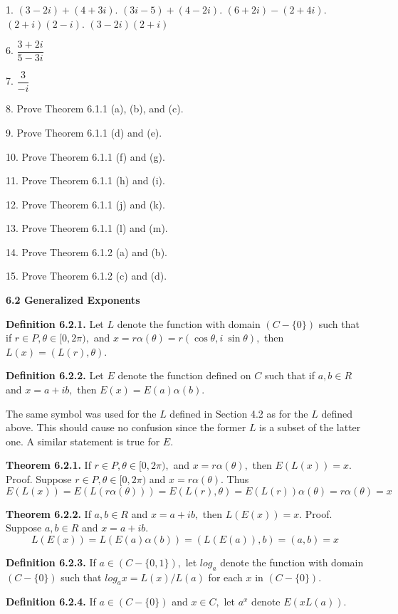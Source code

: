 1. 	$(3 - 2i) + (4 + 3i)$. 	$(3i - 5) + (4 - 2i)$. 	$(6 + 2i) - (2 + 4i)$. 	$(2 + i)(2 - i)$. 	$(3 - 2i)(2 + i)$\nl

6. 	$\dfrac{3 + 2i}{5 - 3i}$\nl

7.  $\dfrac{3}{-i}$\nl

8. 	Prove Theorem 6.1.1 (a), (b), and (c). \nl

9. 	Prove Theorem 6.1.1 (d) and (e).

10. Prove Theorem 6.1.1 (f) and (g).

11. Prove Theorem 6.1.1 (h) and (i).

12. Prove Theorem 6.1.1 (j) and (k).

13. Prove Theorem 6.1.1 (l) and (m).

14. Prove Theorem 6.1.2 (a) and (b).

15. Prove Theorem 6.1.2 (c) and (d).


\newpage
\textbf{6.2 Generalized Exponents}\nl

\textbf{Definition 6.2.1.} Let $L$ denote the function with domain $(C-\{0\})$ such that if $r\in P, \theta\in[0, 2\pi),$ and $x =r\alpha (\theta) = r(\cos \theta, i~\sin \theta),$ then $L(x) = (L(r),\theta).$ \nl

\textbf{Definition 6.2.2.} Let $E$ denote the function defined on $C$ such that if $a,b\in R$ and $x = a + ib,$ then $E(x) = E(a)\alpha(b).$\nl

The same symbol was used for the $L$ defined in Section 4.2 as for the $L$ defined above. This should cause no confusion since the former $L$ is a subset of the latter one. A similar statement is true for $E.$\nl

\textbf{Theorem 6.2.1.} If $r\in P, \theta \in  [0,2\pi),$ and $x =r\alpha(\theta),$ then $E(L(x))=x.$\nl
 Proof. Suppose $r\in P, \theta \in  [0,2\pi)$ and $x =r\alpha(\theta).$ Thus
 \[
 E(L(x)) = E(L(r\alpha(\theta)))=E(L(r),\theta) = E(L(r))\alpha(\theta) = r\alpha(\theta) = x
 \]

\textbf{Theorem 6.2.2.} If $a,b\in R$ and $x = a + ib,$ then $L(E(x))=x.$\nl
Proof. Suppose $a,b\in R$ and $x = a + ib.$
\[
L(E(x)) = L(E(a)\alpha (b)) = (L(E(a)), b) = (a,b) = x
\]

\textbf{Definition 6.2.3.} If $a\in (C-\{ 0, 1 \}),$ let $log_{a}$ denote the function with domain $(C-\{0\})$ such that $log_{a}x=L(x)/L(a)$ for each $x$ in $(C-\{0\}).$\nl

\textbf{Definition 6.2.4.} If $a\in (C-\{0\})$ and $x\in C,$ let $a^{x}$ denote $E(xL(a)).$\nl

